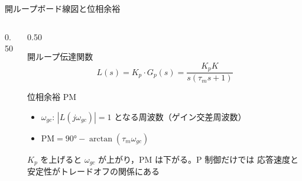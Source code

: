 \begin{frame}{開ループボード線図と位相余裕\later}
  \begin{columns}[c]
    \begin{column}{0.50\textwidth}
      \centering
    \end{column}
    \begin{column}{0.50\textwidth}
      \begin{block}{開ループ伝達関数}\footnotesize
        \setlength{\abovedisplayskip}{2pt}\setlength{\belowdisplayskip}{2pt}%
        \[
          L(s) = K_p \cdot G_p(s) = \frac{K_p K}{s(\tau_m s + 1)}
        \]
      \end{block}

      \vspace{0.3em}

      \begin{block}{位相余裕 PM}\footnotesize
        \vspace{-0.2em}
        \begin{itemize}\setlength{\itemsep}{0.1em}
          \item $\omega_{gc}$: $|L(j\omega_{gc})|=1$ となる周波数（ゲイン交差周波数）
          \item $\text{PM} = 90° - \arctan(\tau_m \omega_{gc})$
        \end{itemize}
      \end{block}

      \vspace{0.3em}

      {\footnotesize $K_p$ を上げると $\omega_{gc}$ が上がり，PM は下がる。P 制御だけでは
      応答速度と安定性がトレードオフの関係にある}
    \end{column}
  \end{columns}
\end{frame}

